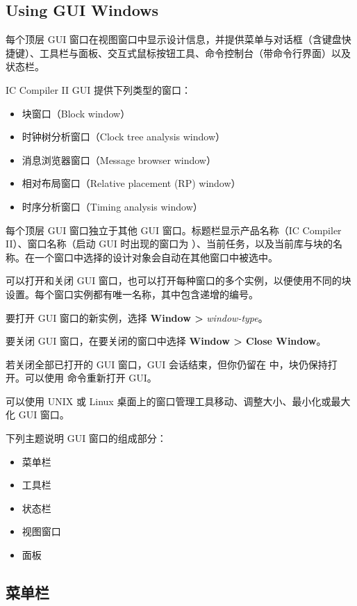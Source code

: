 \subsection*{Using GUI Windows}

每个顶层 GUI 窗口在视图窗口中显示设计信息，并提供菜单与对话框（含键盘快捷键）、工具栏与面板、交互式鼠标按钮工具、命令控制台（带命令行界面）以及状态栏。

IC Compiler II GUI 提供下列类型的窗口：
\begin{itemize}
  \item 块窗口（Block window）
  \item 时钟树分析窗口（Clock tree analysis window）
  \item 消息浏览器窗口（Message browser window）
  \item 相对布局窗口（Relative placement (RP) window）
  \item 时序分析窗口（Timing analysis window）
\end{itemize}

每个顶层 GUI 窗口独立于其他 GUI 窗口。标题栏显示产品名称（IC Compiler II）、窗口名称（启动 GUI 时出现的窗口为 ）、当前任务，以及当前库与块的名称。在一个窗口中选择的设计对象会自动在其他窗口中被选中。

可以打开和关闭 GUI 窗口，也可以打开每种窗口的多个实例，以便使用不同的块设置。每个窗口实例都有唯一名称，其中包含递增的编号。

要打开 GUI 窗口的新实例，选择 \textbf{Window >} \textit{window-type}。

要关闭 GUI 窗口，在要关闭的窗口中选择 \textbf{Window > Close Window}。

\begin{noteBox}
若关闭全部已打开的 GUI 窗口，GUI 会话结束，但你仍留在  中，块仍保持打开。可以使用  命令重新打开 GUI。
\end{noteBox}

可以使用 UNIX 或 Linux 桌面上的窗口管理工具移动、调整大小、最小化或最大化 GUI 窗口。

下列主题说明 GUI 窗口的组成部分：
\begin{itemize}
  \item 菜单栏
  \item 工具栏
  \item 状态栏
  \item 视图窗口
  \item 面板
\end{itemize}

\subsection{菜单栏}
